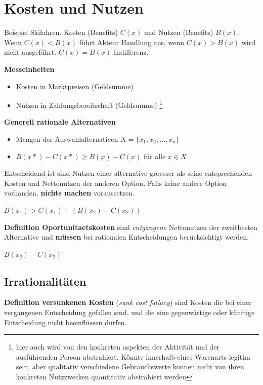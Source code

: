\section{Kosten und Nutzen}

Beispiel Skifahren. Kosten (Benefits) \textbf{ $C(x)$} und Nutzen (Benefits) \textbf{$B(x)$}. Wenn \textbf{$C(x) < B(x)$} führt Akteur Handlung aus, wenn \textbf{$C(x) > B(x)$} wird nicht ausgeführt.
\textbf{$C(x) = B(x)$} Indifferenz.

\textbf{Messeinheiten}
\begin{itemize}
    \item Kosten in Marktpreisen (Geldsumme)
    \item Nutzen in Zahlungsbereitschaft (Geldsumme)
        \footnote{hier auch wird von den konkreten aspekten der Aktivität und der ausführenden Person abstrahiert. Könnte innerhalb eines Warenarts legitim sein, aber qualitativ verschiedene Gebrauchswerte können nicht von ihren konkreten Nutzzwecken quantitativ abstrahiert werden}
\end{itemize}

\textbf{Generell rationale Alternativen}
\begin{itemize}
    \item Mengen der Auswahlalternativen $X = \{x_1, x_2, \dots, x_n\}$
    \item $B(x*) - C(x*) \ge B(x) - C(x)$ für alle $x \in X$
\end{itemize}

Entscheidend ist sind Nutzen einer alternative groesser als seine entsprechenden Kosten und Nettonutzen der anderen Option. Falls keine andere Option vorhanden, \textbf{nichts machen} voraussetzen.
\begin{theorem}
    \label{t_allgemein}
    $B(x_1) > C(x_1) + (B(x_2) - C(x_2))$ 
\end{theorem}
\begin{definition}
    
\end{definition}
\textbf{Definition Oportunitaetskosten} sind \textit{entgangene} Nettonutzen der zweitbesten Alternative und \textbf{müssen} bei rationalen Entscheidungen berücksichtigt werden.

\begin{theorem}
    \label{t_oppkosten}
    $B(x_2) - C(x_2)$
\end{theorem}


\subsection{Irrationalitäten}
\textbf{Definition versunkenen Kosten} (\textit{sunk cost fallacy}) sind Kosten die bei einer vergangenen Entscheidung gefallen sind, und die eine gegenwärtige oder künftige Entscheidung nicht beeinflüssen dürfen. 

